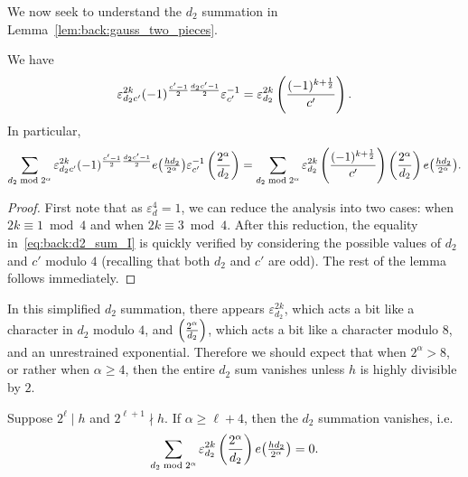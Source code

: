 We now seek to understand the $d_2$ summation in Lemma~\ref{lem:back:gauss_two_pieces}.


\begin{lemma}\label{lem:back:d2_sum_simplifies}
  We have
  \begin{equation}\label{eq:back:d2_sum_I}
    \varepsilon^{2k}_{d_2 c'} (-1)^{\frac{c'-1}{2} \frac{d_2 c' - 1}{2}}
    \varepsilon_{c'}^{-1}
    =
    \varepsilon_{d_2}^{2k} \left(\frac{(-1)^{k + \frac{1}{2}}}{c'}\right).
  \end{equation}
  In particular,
  \begin{equation}
    \sum_{d_2 \bmod 2^\alpha}
    \varepsilon^{2k}_{d_2 c'} (-1)^{\frac{c'-1}{2} \frac{d_2 c' - 1}{2}}
    e\big( \tfrac{h d_2}{2^\alpha} \big)
    \varepsilon_{c'}^{-1} \left(\frac{2^\alpha}{d_2}\right)
    =
    \sum_{d_2 \bmod 2^\alpha}
    \varepsilon_{d_2}^{2k} \left(\frac{(-1)^{k + \frac{1}{2}}}{c'}\right) \left(\frac{2^\alpha}{d_2}\right)
    e\big( \tfrac{h d_2}{2^\alpha} \big).
  \end{equation}
\end{lemma}

\begin{proof}

  First note that as $\varepsilon_d^4 = 1$, we can reduce the analysis into two cases: when
  $2k \equiv 1 \bmod 4$ and when $2k \equiv 3 \bmod 4$.
  After this reduction, the equality in~\eqref{eq:back:d2_sum_I} is quickly verified by
  considering the possible values of $d_2$ and $c'$ modulo $4$ (recalling that both $d_2$
  and $c'$ are odd).
  The rest of the lemma follows immediately.
%
\end{proof}


In this simplified $d_2$ summation, there appears $\varepsilon_{d_2}^{2k}$, which acts a bit
like a character in $d_2$ modulo $4$, and $\left(\frac{2^\alpha}{d_2}\right)$, which acts a bit like a
character modulo $8$, and an unrestrained exponential.
Therefore we should expect that when $2^\alpha > 8$, or rather when $\alpha \geq 4$, then
the entire $d_2$ sum vanishes unless $h$ is highly divisible by $2$.


\begin{lemma}\label{lem:back:d2_sum_is_finite}
  Suppose $2^\ell \mid h$ and $2^{\ell + 1} \nmid h$.
  If $\alpha \geq \ell + 4$, then the $d_2$ summation vanishes, i.e.\
  \begin{equation}
    \sum_{d_2 \bmod 2^\alpha}
    \varepsilon_{d_2}^{2k} \left(\frac{2^\alpha}{d_2}\right) e\big( \tfrac{h d_2}{2^\alpha} \big) = 0.
  \end{equation}
\end{lemma}


